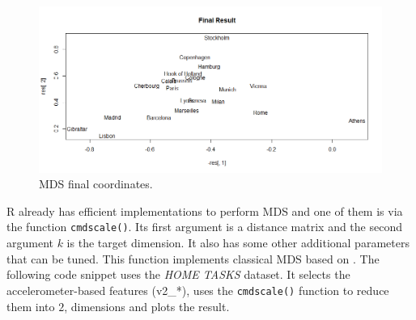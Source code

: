 \documentclass[
  11pt,
]{krantz}
\begin{document}
\begin{figure}

{\centering \includegraphics[width=1\linewidth]{images/mds_final} 

}

\caption{MDS final coordinates.}\label{fig:mdsFinal}
\end{figure}

R already has efficient implementations to perform MDS and one of them is via the function \texttt{cmdscale()}. Its first argument is a distance matrix and the second argument \(k\) is the target dimension. It also has some other additional parameters that can be tuned. This function implements classical MDS based on \citet{gower1966}. The following code snippet uses the \emph{HOME TASKS} dataset. It selects the accelerometer-based features (v2\_*), uses the \texttt{cmdscale()} function to reduce them into \(2\), dimensions and plots the result.
\end{document}

